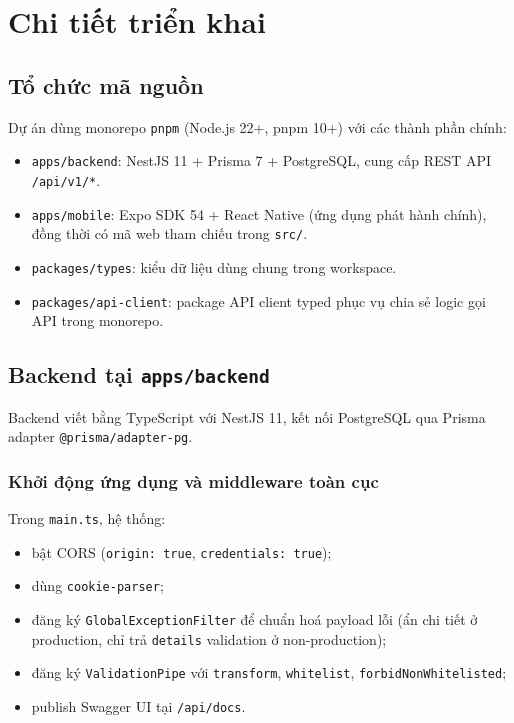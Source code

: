 \section{Chi tiết triển khai}

\subsection{Tổ chức mã nguồn}

Dự án dùng monorepo \texttt{pnpm} (Node.js 22+, pnpm 10+) với các thành phần chính:

\begin{itemize}
  \item \texttt{apps/backend}: NestJS 11 + Prisma 7 + PostgreSQL, cung cấp REST API \texttt{/api/v1/*}.
  \item \texttt{apps/mobile}: Expo SDK 54 + React Native (ứng dụng phát hành chính), đồng thời có mã web tham chiếu trong \texttt{src/}.
  \item \texttt{packages/types}: kiểu dữ liệu dùng chung trong workspace.
  \item \texttt{packages/api-client}: package API client typed phục vụ chia sẻ logic gọi API trong monorepo.
\end{itemize}

\subsection{Backend tại \texttt{apps/backend}}

Backend viết bằng TypeScript với NestJS 11, kết nối PostgreSQL qua Prisma adapter \texttt{@prisma/adapter-pg}.

\subsubsection{Khởi động ứng dụng và middleware toàn cục}

Trong \texttt{main.ts}, hệ thống:
\begin{itemize}
  \item bật CORS (\texttt{origin: true}, \texttt{credentials: true});
  \item dùng \texttt{cookie-parser};
  \item đăng ký \texttt{GlobalExceptionFilter} để chuẩn hoá payload lỗi (ẩn chi tiết ở production, chỉ trả \texttt{details} validation ở non-production);
  \item đăng ký \texttt{ValidationPipe} với \texttt{transform}, \texttt{whitelist}, \texttt{forbidNonWhitelisted};
  \item publish Swagger UI tại \texttt{/api/docs}.
\end{itemize}

